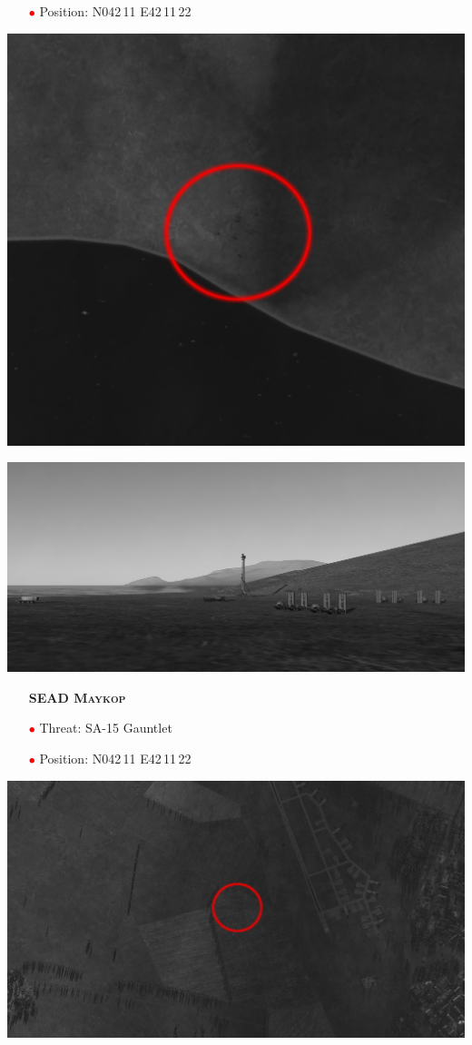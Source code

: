 \documentclass[a4paper,12pt,dvipsnames]{letter}
\newcommand{\myHead}[1]{{\LARGE\textsc{\textbf{#1}}}}
\newcommand{\ri}{\textcolor{Red}{$\bullet$\;}}
\begin{document}
{\begin{itemize}
 \item[\ri] Position: N042\,11 E42\,11\,22
\end{itemize}
\begin{center}
\includegraphics[width=0.7\linewidth]{../gimp/SA10_01.png}
\end{center}
\vspace{1em}
\begin{center}
\includegraphics[width=0.7\linewidth]{../gimp/SA10_02.png}
\end{center}
% 
\vspace{0.5em}
\newpage
\begin{itemize}
 \item[] \myHead{SEAD Maykop}
 \item[\ri] Threat: SA-15 Gauntlet
 \item[\ri] Position: N042\,11 E42\,11\,22 
\end{itemize}
%
\begin{center}
\includegraphics[width=0.7\linewidth]{../gimp/SA15_Sat.png}

\end{center}}
\end{document}
